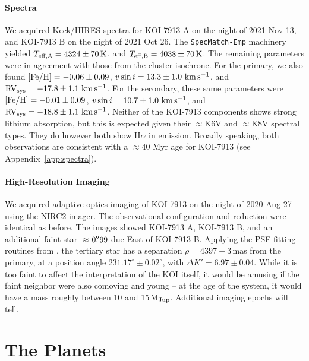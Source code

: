 \documentclass[12pt,twocolumn]{aastex63}
\newcommand{\mkms}{{\rm \,km\,s^{-1}}}  %
\begin{document}
\paragraph{Spectra}
We acquired Keck/HIRES spectra for KOI-7913 A on the night of 2021 Nov
13, and KOI-7913 B on the night of 2021 Oct 26.  The
\texttt{SpecMatch-Emp} machinery yielded $T_{\rm
eff,A} = 4324 \pm 70\,{\rm K}$, and $T_{\rm eff,B} = 4038 \pm 70\,{\rm
K}$.  The remaining parameters were in agreement with those from the
cluster isochrone.  For the primary, we also found $[{\rm Fe/H}]=
-0.06 \pm 0.09$, $v\sin i = 13.3 \pm 1.0\,\mkms$, and ${\rm RV}_{\rm
sys} = -17.8 \pm 1.1\,\mkms$.  For the secondary, these same
parameters were $[{\rm Fe/H}]= -0.01 \pm 0.09$, $v\sin i = 10.7 \pm
1.0\,\mkms$, and ${\rm RV}_{\rm sys} = -18.8 \pm 1.1\,\mkms$.  Neither
of the KOI-7913 components shows strong lithium absorption, but this
is expected given their $\approx$K6V and $\approx$K8V spectral types.
They do however both show H$\alpha$ in emission.  Broadly speaking,
both observations are consistent with a $\approx$40 Myr age for
KOI-7913 (see Appendix~\ref{app:spectra}).


\paragraph{High-Resolution Imaging}
We acquired adaptive optics imaging of KOI-7913 on the night of 2020
Aug 27 using the NIRC2 imager.  The observational configuration and
reduction were identical as before.  The images showed KOI-7913 A,
KOI-7913 B, and an additional faint star $\approx$$0\mbox{$.\!\!^{\prime\prime}$}99$ due East
of KOI-7913 B.  Applying the PSF-fitting routines from
\citet{kraus_impact_2016}, the tertiary star has a separation $\rho =
4397 \pm 3$\,mas from the primary, at a position angle $231.17^\circ
\pm 0.02^\circ$, with $\Delta K' = 6.97 \pm 0.04$.  While it is too
faint to affect the interpretation of the KOI itself, it would be
amusing if the faint neighbor were also comoving and young -- at the
age of the system, it would have a mass roughly between 10 and
15\,M$_{\rm Jup}$.  Additional imaging epochs will tell.




\section{The Planets}
\label{sec:planets}
\end{document}

